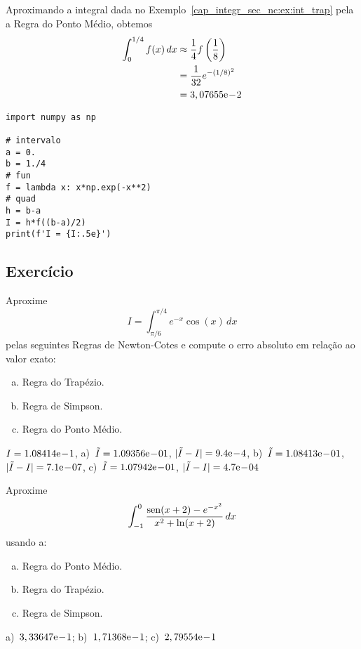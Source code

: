 \begin{ex}\label{cap_integr_sec_nc:ex:int_pto_medio}
  Aproximando a integral dada no Exemplo~\ref{cap_integr_sec_nc:ex:int_trap} pela a Regra do Ponto Médio, obtemos
  \begin{subequations}
    \begin{align}
      \int_0^{1/4} f(x)\,dx &\approx \frac{1}{4}f\left(\frac{1}{8}\right)\\
                            &= \frac{1}{32}e^{-(1/8)^2}\\
                            &= 3,07655\mathrm{e}\!-\!2
    \end{align}
  \end{subequations}

\begin{lstlisting}
import numpy as np

# intervalo
a = 0.
b = 1./4
# fun
f = lambda x: x*np.exp(-x**2)
# quad
h = b-a
I = h*f((b-a)/2)
print(f'I = {I:.5e}')
\end{lstlisting}
\end{ex}

\subsection{Exercício}

\begin{exer}
  Aproxime
  \begin{equation}
    I = \int_{\pi/6}^{\pi/4} e^{-x}\cos(x)\,dx
  \end{equation}
  pelas seguintes Regras de Newton-Cotes e compute o erro absoluto em relação ao valor exato:
  \begin{enumerate}[a)]
  \item Regra do Trapézio.
  \item Regra de Simpson.
  \item Regra do Ponto Médio.
  \end{enumerate}
\end{exer}
\begin{resp}
  $I = 1.08414\mathrm{e}\!-\!1$, a)~$\tilde{I} = 1.09356\mathrm{e}\!-\!01$, $|\tilde{I}-I| = 9.4\mathrm{e}\!-\!4$, b)~$\tilde{I} = 1.08413\mathrm{e}\!-\!01$, $|\tilde{I}-I| = 7.1\mathrm{e}\!-\!07$, c)~$\tilde{I} = 1.07942\mathrm{e}\!-\!01$, $|\tilde{I}-I| = 4.7\mathrm{e}\!-\!04$
\end{resp}

\begin{exer}
  Aproxime
  \begin{equation}
    \int_{-1}^0 \frac{\operatorname{sen}(x+2)-e^{-x^2}}{x^2+\ln(x+2)}\,dx
  \end{equation}
usando a:
\begin{enumerate}[a)]
\item Regra do Ponto Médio.
\item Regra do Trapézio.
\item Regra de Simpson.
\end{enumerate}
\end{exer}
\begin{resp}
  a)~$3,33647\mathrm{e}\!-\!1$; b)~$1,71368\mathrm{e}\!-\!1$; c)~$2,79554\mathrm{e}\!-\!1$
\end{resp}

